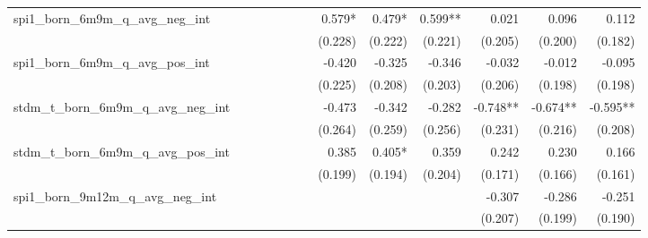 \begin{tabular}{lrrrrrrrrrrrr}
spi1\_born\_6m9m\_q\_avg\_neg\_int          &              &              &              &              &              &              &       0.579* &       0.479* &      0.599** &        0.021 &        0.096 &        0.112 \\ 
                                            &              &              &              &              &              &              &      (0.228) &      (0.222) &      (0.221) &      (0.205) &      (0.200) &      (0.182) \\ 
spi1\_born\_6m9m\_q\_avg\_pos\_int          &              &              &              &              &              &              &       -0.420 &       -0.325 &       -0.346 &       -0.032 &       -0.012 &       -0.095 \\ 
                                            &              &              &              &              &              &              &      (0.225) &      (0.208) &      (0.203) &      (0.206) &      (0.198) &      (0.198) \\ 
stdm\_t\_born\_6m9m\_q\_avg\_neg\_int       &              &              &              &              &              &              &       -0.473 &       -0.342 &       -0.282 &     -0.748** &     -0.674** &     -0.595** \\ 
                                            &              &              &              &              &              &              &      (0.264) &      (0.259) &      (0.256) &      (0.231) &      (0.216) &      (0.208) \\ 
stdm\_t\_born\_6m9m\_q\_avg\_pos\_int       &              &              &              &              &              &              &        0.385 &       0.405* &        0.359 &        0.242 &        0.230 &        0.166 \\ 
                                            &              &              &              &              &              &              &      (0.199) &      (0.194) &      (0.204) &      (0.171) &      (0.166) &      (0.161) \\ 
spi1\_born\_9m12m\_q\_avg\_neg\_int         &              &              &              &              &              &              &              &              &              &       -0.307 &       -0.286 &       -0.251 \\ 
                                            &              &              &              &              &              &              &              &              &              &      (0.207) &      (0.199) &      (0.190) \\ 

\end{tabular}
